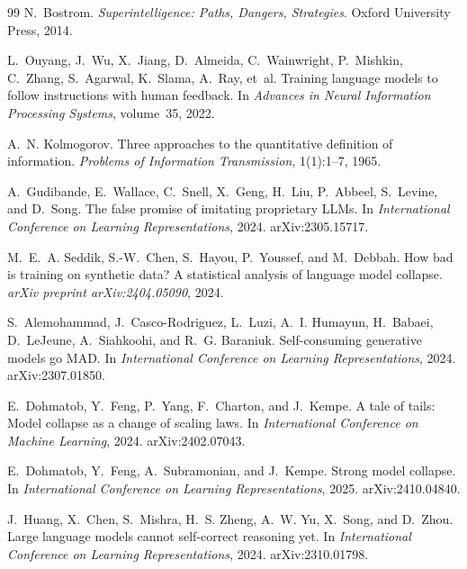 \documentclass[11pt,a4paper]{article}
\begin{document}
\begin{thebibliography}{99}
N.~Bostrom.
\newblock \emph{Superintelligence: Paths, Dangers, Strategies}.
\newblock Oxford University Press, 2014.

L.~Ouyang, J.~Wu, X.~Jiang, D.~Almeida, C.~Wainwright, P.~Mishkin, C.~Zhang, S.~Agarwal, K.~Slama, A.~Ray, et~al.
\newblock Training language models to follow instructions with human feedback.
\newblock In \emph{Advances in Neural Information Processing Systems}, volume~35, 2022.

A.~N. Kolmogorov.
\newblock Three approaches to the quantitative definition of information.
\newblock \emph{Problems of Information Transmission}, 1(1):1--7, 1965.


A.~Gudibande, E.~Wallace, C.~Snell, X.~Geng, H.~Liu, P.~Abbeel, S.~Levine, and D.~Song.
\newblock The false promise of imitating proprietary {LLMs}.
\newblock In \emph{International Conference on Learning Representations}, 2024.
\newblock arXiv:2305.15717.

M.~E.~A. Seddik, S.-W.~Chen, S.~Hayou, P.~Youssef, and M.~Debbah.
\newblock How bad is training on synthetic data? {A} statistical analysis of language model collapse.
\newblock \emph{arXiv preprint arXiv:2404.05090}, 2024.

S.~Alemohammad, J.~Casco-Rodriguez, L.~Luzi, A.~I. Humayun, H.~Babaei, D.~LeJeune, A.~Siahkoohi, and R.~G. Baraniuk.
\newblock Self-consuming generative models go {MAD}.
\newblock In \emph{International Conference on Learning Representations}, 2024.
\newblock arXiv:2307.01850.

E.~Dohmatob, Y.~Feng, P.~Yang, F.~Charton, and J.~Kempe.
\newblock A tale of tails: Model collapse as a change of scaling laws.
\newblock In \emph{International Conference on Machine Learning}, 2024.
\newblock arXiv:2402.07043.

E.~Dohmatob, Y.~Feng, A.~Subramonian, and J.~Kempe.
\newblock Strong model collapse.
\newblock In \emph{International Conference on Learning Representations}, 2025.
\newblock arXiv:2410.04840.

J.~Huang, X.~Chen, S.~Mishra, H.~S. Zheng, A.~W. Yu, X.~Song, and D.~Zhou.
\newblock Large language models cannot self-correct reasoning yet.
\newblock In \emph{International Conference on Learning Representations}, 2024.
\newblock arXiv:2310.01798.


\end{thebibliography}
\end{document}
